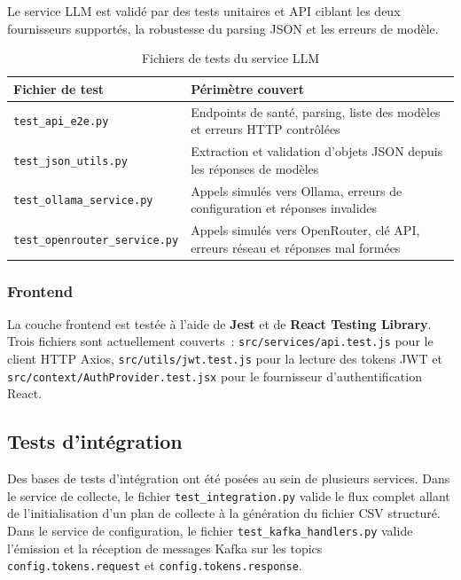 Le service LLM est validé par des tests unitaires et API ciblant les deux fournisseurs supportés,
la robustesse du parsing JSON et les erreurs de modèle.

\begin{table}[H]
\centering
\small
\caption{Fichiers de tests du service LLM}
\label{tab:tests-llm}
\begin{tabular}{|>{\raggedright\arraybackslash}p{5cm}
                |>{\raggedright\arraybackslash}p{8cm}|}
\hline
\textbf{Fichier de test} & \textbf{Périmètre couvert} \\
\hline
\texttt{test\_api\_e2e.py} & Endpoints de santé, parsing, liste des modèles et erreurs HTTP contrôlées \\
\hline
\texttt{test\_json\_utils.py} & Extraction et validation d'objets JSON depuis les réponses de modèles \\
\hline
\texttt{test\_ollama\_service.py} & Appels simulés vers Ollama, erreurs de configuration et réponses invalides \\
\hline
\texttt{test\_openrouter\_service.py} & Appels simulés vers OpenRouter, clé API, erreurs réseau et réponses mal formées \\
\hline
\end{tabular}
\end{table}

\subsubsection*{Frontend}

La couche frontend est testée à l'aide de \textbf{Jest} et de \textbf{React Testing Library}.
Trois fichiers sont actuellement couverts~: \texttt{src/services/api.test.js} pour le client
HTTP Axios, \texttt{src/utils/jwt.test.js} pour la lecture des tokens JWT et
\texttt{src/context/AuthProvider.test.jsx} pour le fournisseur d'authentification React.

\subsection{Tests d'intégration}

Des bases de tests d'intégration ont été posées au sein de plusieurs services. Dans le service
de collecte, le fichier \texttt{test\_integration.py} valide le flux complet allant de
l'initialisation d'un plan de collecte à la génération du fichier CSV structuré. Dans le service
de configuration, le fichier \texttt{test\_kafka\_handlers.py} valide l'émission et la réception
de messages Kafka sur les topics \texttt{config.tokens.request} et
\texttt{config.tokens.response}.

